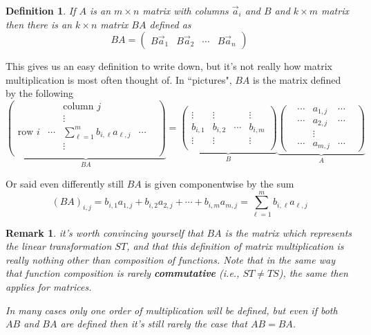 \documentclass[12pt]{article}
\numberwithin{equation}{subsection}
\numberwithin{figure}{subsection}
\newtheorem{defn}[subsection]{Definition}
\theoremstyle{note}
\newtheorem{remark}[subsection]{Remark}
\begin{document}
\begin{defn}
	If $A$ is an $m\times n$ matrix with columns $\vec{a}_i$ and $B$ and $k\times m$ matrix then there is an $k\times n$ matrix $BA$ defined as \begin{equation} BA=\begin{pmatrix} B\vec{a}_1 & B\vec{a}_2 & \cdots & B\vec{a}_n\end{pmatrix} \end{equation} 
	\end{defn}
This gives us an easy definition to write down, but it's not really how matrix multiplication is most often thought of. In ``pictures", $BA$ is the matrix defined by the following 
\begin{equation} 
	\underbrace{\begin{pmatrix} & & \text{column $j$} & & \\ 
	& & \vdots & & \\
	\text{row $i$} &\cdots & \sum_{\ell=1}^m b_{i,\ell} a_{\ell,j}& \cdots & \\ 
	&&\vdots && \\
	\end{pmatrix}}_{BA} = 
	\underbrace{\begin{pmatrix}  & & &  \\ \vdots &\vdots &  &\vdots  \\ b_{i,1} & b_{i,2} & \cdots & b_{i,m} \\ \vdots & \vdots & & \vdots  \\ & & &\end{pmatrix}}_B
	\underbrace{\begin{pmatrix} & \cdots & a_{1,j} & \cdots & \\  & \cdots & a_{2,j} & \cdots & \\ & & \vdots & & \\  & \cdots  & a_{m,j} & \cdots & \end{pmatrix}}_A	
	  \end{equation}
	  
	  	Or said even differently still $BA$ is given componentwise by the sum \begin{equation} (BA)_{i,j}=b_{i,1}a_{1,j}+b_{i,2}a_{2,j}+\cdots+b_{i,m}a_{m,j}=\sum_{\ell=1}^m b_{i,\ell}a_{\ell,j}\end{equation}
		
		\begin{remark}
			it's worth convincing yourself that $BA$ is the matrix which represents the linear transformation $ST$, and that this definition of matrix multiplication is really nothing other than composition of functions. Note that in the same way that function composition is rarely \textbf{commutative} (i.e., $ST\neq TS$), the same then applies for matrices. 
			
			In many cases only one order of multiplication will be defined, but even if both $AB$ and $BA$ are defined then it's still rarely the case that $AB=BA$. 
		
		\end{remark}
		
\end{document}
